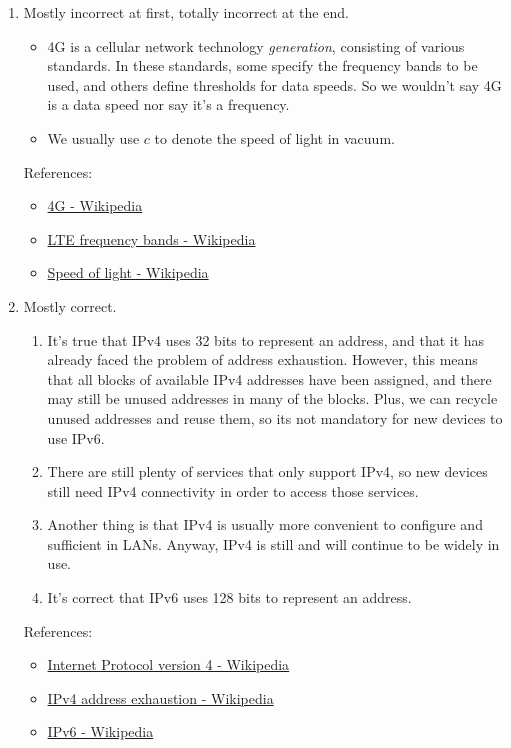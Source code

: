 \documentclass[12pt, a4paper]{article}
\begin{document}
\begin{enumerate}
    \item Mostly incorrect at first, totally incorrect at the end.
    \begin{itemize}
      \item 4G is a cellular network technology \textit{generation}, consisting
        of various standards. In these standards, some specify the frequency
        bands to be used, and others define thresholds for data speeds. So we
        wouldn't say 4G is a data speed nor say it's a frequency.
      \item We usually use $c$ to denote the speed of light in vacuum.
    \end{itemize}

    References:
    \begin{itemize}
      \item \href{https://en.wikipedia.org/wiki/4G}{4G - Wikipedia}
      \item \href{https://en.wikipedia.org/wiki/LTE_frequency_bands}{LTE frequency bands - Wikipedia}
      \item \href{https://en.wikipedia.org/wiki/Speed_of_light}{Speed of light - Wikipedia}
    \end{itemize}

    \item Mostly correct.
    \begin{enumerate}
      \item It's true that IPv4 uses 32 bits to represent an address, and that
        it has already faced the problem of address exhaustion. However, this
        means that all blocks of available IPv4 addresses have been assigned,
        and there may still be unused addresses in many of the blocks. Plus,
        we can recycle unused addresses and reuse them, so its not mandatory
        for new devices to use IPv6.
      \item There are still plenty of services that only support IPv4, so new
        devices still need IPv4 connectivity in order to access those services.
      \item Another thing is that IPv4 is usually more convenient to configure
        and sufficient in LANs. Anyway, IPv4 is still and will continue to be
        widely in use.
      \item It's correct that IPv6 uses 128 bits to represent an address.
    \end{enumerate}

    References:
    \begin{itemize}
      \item \href{https://en.wikipedia.org/wiki/Internet_Protocol_version_4}{Internet Protocol version 4 - Wikipedia}
      \item \href{https://en.wikipedia.org/wiki/IPv4_address_exhaustion}{IPv4 address exhaustion - Wikipedia}
      \item \href{https://en.wikipedia.org/wiki/IPv6}{IPv6 - Wikipedia}
    \end{itemize}
  \end{enumerate}
\end{document}
